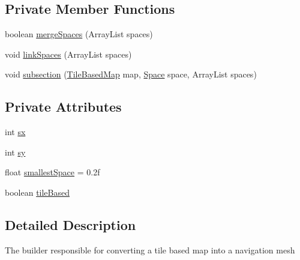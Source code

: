 \subsection*{Private Member Functions}
\begin{DoxyCompactItemize}
\item 
boolean \mbox{\hyperlink{classorg_1_1newdawn_1_1slick_1_1util_1_1pathfinding_1_1navmesh_1_1_nav_mesh_builder_a4d33879ab429fd9f48772a1c163b47d2}{merge\+Spaces}} (Array\+List spaces)
\item 
void \mbox{\hyperlink{classorg_1_1newdawn_1_1slick_1_1util_1_1pathfinding_1_1navmesh_1_1_nav_mesh_builder_a56bf623a655031fe106b9bdb7e2216b8}{link\+Spaces}} (Array\+List spaces)
\item 
void \mbox{\hyperlink{classorg_1_1newdawn_1_1slick_1_1util_1_1pathfinding_1_1navmesh_1_1_nav_mesh_builder_a37b630686bc4b90ec044f5e72bfd252b}{subsection}} (\mbox{\hyperlink{interfaceorg_1_1newdawn_1_1slick_1_1util_1_1pathfinding_1_1_tile_based_map}{Tile\+Based\+Map}} map, \mbox{\hyperlink{classorg_1_1newdawn_1_1slick_1_1util_1_1pathfinding_1_1navmesh_1_1_space}{Space}} space, Array\+List spaces)
\end{DoxyCompactItemize}
\subsection*{Private Attributes}
\begin{DoxyCompactItemize}
\item 
int \mbox{\hyperlink{classorg_1_1newdawn_1_1slick_1_1util_1_1pathfinding_1_1navmesh_1_1_nav_mesh_builder_aedfa8227f2b8b06cdb90ca23da209988}{sx}}
\item 
int \mbox{\hyperlink{classorg_1_1newdawn_1_1slick_1_1util_1_1pathfinding_1_1navmesh_1_1_nav_mesh_builder_af66e210bbd7a345389ad00afc3aab345}{sy}}
\item 
float \mbox{\hyperlink{classorg_1_1newdawn_1_1slick_1_1util_1_1pathfinding_1_1navmesh_1_1_nav_mesh_builder_a2a9b238c417c502d5fc000d47098a626}{smallest\+Space}} = 0.\+2f
\item 
boolean \mbox{\hyperlink{classorg_1_1newdawn_1_1slick_1_1util_1_1pathfinding_1_1navmesh_1_1_nav_mesh_builder_a495d0fb92e15bfcaf8ca499b5a7a0b56}{tile\+Based}}
\end{DoxyCompactItemize}


\subsection{Detailed Description}
The builder responsible for converting a tile based map into a navigation mesh


